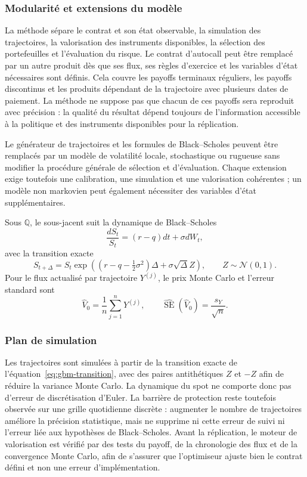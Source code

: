 \documentclass[12pt,a4paper]{article}
\newcommand{\Q}{\mathbb{Q}}
\newcommand{\1}{\mathbf{1}}
\begin{document}
\subsubsection*{Modularité et extensions du modèle}

La méthode sépare le contrat et son état observable, la simulation des
trajectoires, la valorisation des instruments disponibles, la sélection des
portefeuilles et l'évaluation du risque. Le contrat d'autocall peut être remplacé
par un autre produit dès que ses flux, ses règles d'exercice et les variables
d'état nécessaires sont définis. Cela couvre les payoffs terminaux réguliers,
les payoffs discontinus et les produits dépendant de la trajectoire avec
plusieurs dates de paiement. La méthode ne suppose pas que chacun de ces payoffs
sera reproduit avec précision : la qualité du résultat dépend toujours de
l'information accessible à la politique et des instruments disponibles pour la
réplication.

Le générateur de trajectoires et les formules de Black--Scholes peuvent être
remplacés par un modèle de volatilité locale, stochastique ou rugueuse sans
modifier la procédure générale de sélection et d'évaluation. Chaque extension
exige toutefois une calibration, une simulation et une valorisation cohérentes ;
un modèle non markovien peut également nécessiter des variables d'état
supplémentaires.

Sous $\Q$, le sous-jacent suit la dynamique de Black--Scholes
\cite{blackscholes1973}
\begin{equation}
 \frac{dS_t}{S_t}=(r-q)dt+\sigma dW_t,
\label{eq:bs-dynamics}
\end{equation}
avec la transition exacte
\begin{equation}
 S_{t+\Delta}=S_t\exp\left((r-q-\tfrac12\sigma^2)\Delta
 +\sigma\sqrt{\Delta}Z\right),\qquad Z\sim\mathcal N(0,1).
\label{eq:gbm-transition}
\end{equation}
Pour le flux actualisé par trajectoire $Y^{(j)}$, le prix Monte Carlo et l'erreur standard sont
\cite{glasserman2004}
\begin{equation}
 \widehat V_0=\frac1n\sum_{j=1}^nY^{(j)},\qquad
 \widehat{\operatorname{SE}}(\widehat V_0)=\frac{s_Y}{\sqrt n}.
\label{eq:mc-estimator}
\end{equation}
\subsubsection*{Plan de simulation}

Les trajectoires sont simulées à partir de la transition exacte de
l'équation~\eqref{eq:gbm-transition}, avec des paires antithétiques $Z$ et $-Z$
afin de réduire la variance Monte Carlo. La dynamique du spot ne comporte donc
pas d'erreur de discrétisation d'Euler. La barrière de protection reste toutefois
observée sur une grille quotidienne discrète : augmenter le nombre de trajectoires
améliore la précision statistique, mais ne supprime ni cette erreur de suivi ni
l'erreur liée aux hypothèses de Black--Scholes. Avant la réplication, le moteur
de valorisation est vérifié par des tests du payoff, de la chronologie des flux
et de la convergence Monte Carlo, afin de s'assurer que l'optimiseur ajuste bien
le contrat défini et non une erreur d'implémentation.
\end{document}
